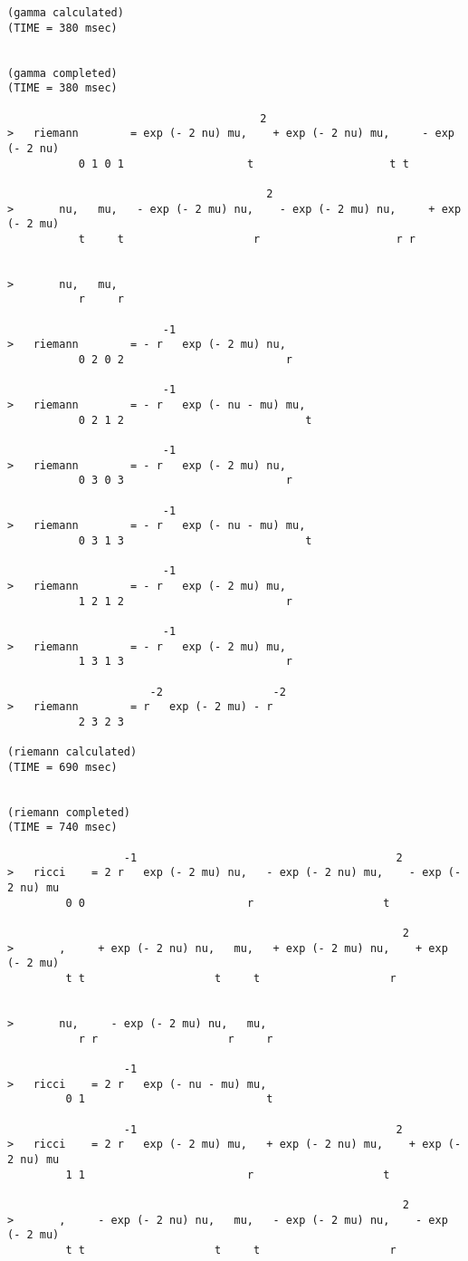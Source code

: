 \begin{verbatim}
(gamma calculated)
(TIME = 380 msec)


(gamma completed)
(TIME = 380 msec)

                                       2
>   riemann        = exp (- 2 nu) mu,    + exp (- 2 nu) mu,     - exp (- 2 nu)
           0 1 0 1                   t                     t t

                                        2
>       nu,   mu,   - exp (- 2 mu) nu,    - exp (- 2 mu) nu,     + exp (- 2 mu)
           t     t                    r                     r r


>       nu,   mu,
           r     r

                        -1
>   riemann        = - r   exp (- 2 mu) nu,
           0 2 0 2                         r

                        -1
>   riemann        = - r   exp (- nu - mu) mu,
           0 2 1 2                            t

                        -1
>   riemann        = - r   exp (- 2 mu) nu,
           0 3 0 3                         r

                        -1
>   riemann        = - r   exp (- nu - mu) mu,
           0 3 1 3                            t

                        -1
>   riemann        = - r   exp (- 2 mu) mu,
           1 2 1 2                         r

                        -1
>   riemann        = - r   exp (- 2 mu) mu,
           1 3 1 3                         r

                      -2                 -2
>   riemann        = r   exp (- 2 mu) - r
           2 3 2 3

(riemann calculated)
(TIME = 690 msec)


(riemann completed)
(TIME = 740 msec)

                  -1                                        2
>   ricci    = 2 r   exp (- 2 mu) nu,   - exp (- 2 nu) mu,    - exp (- 2 nu) mu
         0 0                         r                    t

                                                             2
>       ,     + exp (- 2 nu) nu,   mu,   + exp (- 2 mu) nu,    + exp (- 2 mu)
         t t                    t     t                    r


>       nu,     - exp (- 2 mu) nu,   mu,
           r r                    r     r

                  -1
>   ricci    = 2 r   exp (- nu - mu) mu,
         0 1                            t

                  -1                                        2
>   ricci    = 2 r   exp (- 2 mu) mu,   + exp (- 2 nu) mu,    + exp (- 2 nu) mu
         1 1                         r                    t

                                                             2
>       ,     - exp (- 2 nu) nu,   mu,   - exp (- 2 mu) nu,    - exp (- 2 mu)
         t t                    t     t                    r

\end{verbatim}

